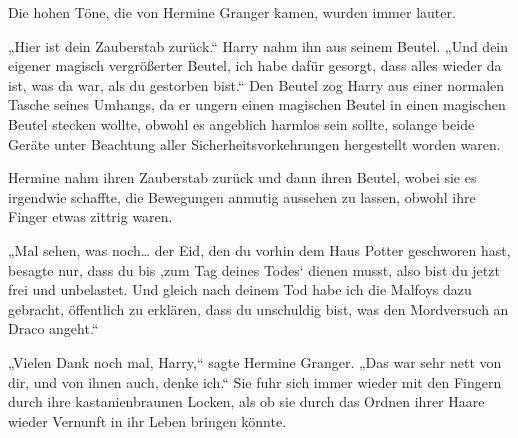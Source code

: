Die hohen Töne, die von Hermine Granger kamen, wurden immer lauter.

„Hier ist dein Zauberstab zurück.“
Harry nahm ihn aus seinem Beutel.
„Und dein eigener magisch vergrößerter Beutel, ich habe dafür gesorgt, dass alles wieder da ist, was da war, als du gestorben bist.“
Den Beutel zog Harry aus einer normalen Tasche seines Umhangs, da er ungern einen magischen Beutel in einen magischen Beutel stecken wollte, obwohl es angeblich harmlos sein sollte, solange beide Geräte unter Beachtung aller Sicherheitsvorkehrungen hergestellt worden waren.

Hermine nahm ihren Zauberstab zurück und dann ihren Beutel, wobei sie es irgendwie schaffte, die Bewegungen anmutig aussehen zu lassen, obwohl ihre Finger etwas zittrig waren.

„Mal sehen, was noch… der Eid, den du vorhin dem Haus Potter geschworen hast, besagte nur, dass du bis ‚zum Tag deines Todes‘ dienen musst, also bist du jetzt frei und unbelastet. Und gleich nach deinem Tod habe ich die Malfoys dazu gebracht, öffentlich zu erklären, dass du unschuldig bist, was den Mordversuch an Draco angeht.“

„Vielen Dank noch mal, Harry,“ sagte Hermine Granger. „Das war sehr nett von dir, und von ihnen auch, denke ich.“
Sie fuhr sich immer wieder mit den Fingern durch ihre kastanienbraunen Locken, als ob sie durch das Ordnen ihrer Haare wieder Vernunft in ihr Leben bringen könnte.


